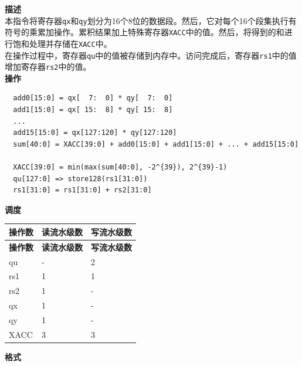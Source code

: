 \textbf{描述}\\
本指令将寄存器\lstinline{qx}和\lstinline{qy}划分为16个8位的数据段。然后，它对每个16个段集执行有符号的乘累加操作。累积结果加上特殊寄存器\lstinline{XACC}中的值。然后，将得到的和进行饱和处理并存储在\lstinline{XACC}中。\\ 在操作过程中，寄存器\lstinline{qu}中的值被存储到内存中。访问完成后，寄存器\lstinline{rs1}中的值增加寄存器\lstinline{rs2}中的值。\\
\textbf{操作}
\begin{lstlisting}
  add0[15:0] = qx[  7:  0] * qy[  7:  0]
  add1[15:0] = qx[ 15:  8] * qy[ 15:  8]
  ...
  add15[15:0] = qx[127:120] * qy[127:120]
  sum[40:0] = XACC[39:0] + add0[15:0] + add1[15:0] + ... + add15[15:0]

  XACC[39:0] = min(max(sum[40:0], -2^{39}), 2^{39}-1)
  qu[127:0] => store128(rs1[31:0])
  rs1[31:0] = rs1[31:0] + rs2[31:0]
\end{lstlisting}

\textbf{调度}\\
\begin{longtable}[c]{|l|l|l|}
    \hline
    \rowcolor{lightgray}
    \textbf{操作数} & \textbf{读流水级数} & \textbf{写流水级数} \\\hline
    \endfirsthead
    \hline
    \rowcolor{lightgray}
     \textbf{操作数} & \textbf{读流水级数} & \textbf{写流水级数} \\\hline
    \endhead
    \hline
    \endfoot

    qu & - & 2 \\\hline
    rs1 & 1 & 1 \\\hline
    rs2 & 1 & - \\\hline
     qx & 1 & - \\\hline
     qy & 1 & - \\\hline
     XACC & 3 & 3

\end{longtable}

\textbf{格式}\\

